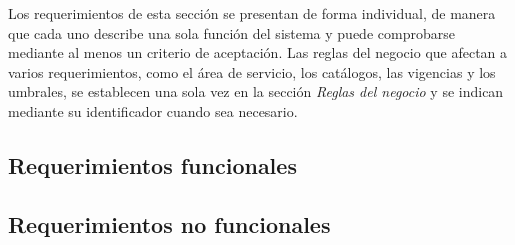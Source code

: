 Los requerimientos de esta sección se presentan de forma individual, de manera que cada uno describe una sola función del sistema y puede comprobarse mediante al menos un criterio de aceptación. Las reglas del negocio que afectan a varios requerimientos, como el área de servicio, los catálogos, las vigencias y los umbrales, se establecen una sola vez en la sección \textit{Reglas del negocio} y se indican mediante su identificador cuando sea necesario.


\subsection{Requerimientos funcionales}


\subsection{Requerimientos no funcionales}
